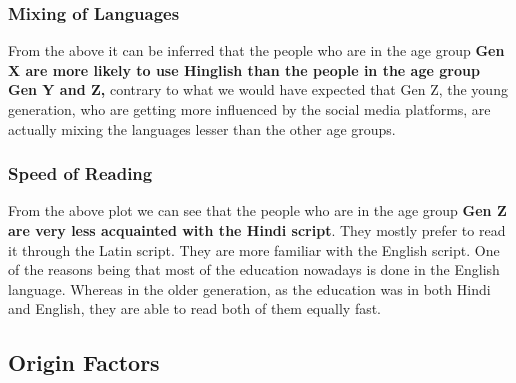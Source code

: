 \documentclass{article}
\begin{document}
\begin{figure}[H]
    \centering
\end{figure}

\subsubsection{Mixing of Languages}
From the above it can be inferred that the people who are in the age group \textbf{Gen X are more likely to use Hinglish than the people in the age group Gen Y and Z, } contrary to what we would have expected that Gen Z, the young generation, who are getting more influenced by the social media platforms, are actually mixing the languages lesser than the other age groups.

\subsubsection{Speed of Reading}
From the above plot we can see that the people who are in the age group \textbf{Gen Z are very less acquainted with the Hindi script}. They mostly prefer to read it through the Latin script. They are more familiar with the English script. One of the reasons being that most of the education nowadays is done in the English language. Whereas in the older generation, as the education was in both Hindi and English, they are able to read both of them equally fast.

\subsection{Origin Factors}
\end{document}

